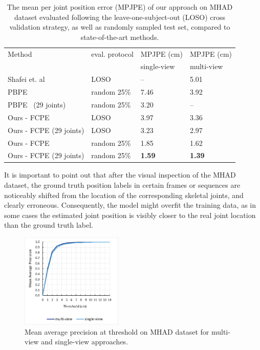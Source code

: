 \setlength{\tabcolsep}{4pt}
\begin{table}[H]
\begin{center}
\caption[Mean per joint position error on MHAD dataset, compared to state-of-the-art methods.]{The mean per joint position error (MPJPE) of our approach on MHAD dataset evaluated following the leave-one-subject-out (LOSO) cross validation strategy, as well as randomly sampled test set, compared to state-of-the-art methods.}
\label{table:mhad_results}
\begin{tabular}{llll}
\hline\noalign{\smallskip}
Method & eval. protocol &MPJPE (cm) & MPJPE (cm) \\
& & single-view & multi-view\\
\noalign{\smallskip}
\hline
\noalign{\smallskip}
Shafei et. al~\cite{Shafaei16}& LOSO & – & 5.01\\ 
PBPE~\cite{Ali19} &random 25\%& 7.46 & 3.92\\
PBPE~\cite{Ali19} (29 joints)&random 25\% & 3.20 & –\\
\hline\noalign{\smallskip}
Ours - FCPE &LOSO& 3.97 &3.36 \\ 
Ours - FCPE  (29 joints)&LOSO& 3.23& 2.97\\ 
Ours - FCPE &random 25\%&  1.85  & 1.62\\ 
Ours - FCPE  (29 joints)&random 25\%& {\bf 1.59}& {\bf 1.39}\\ 
\hline
\end{tabular}
\end{center}
\end{table}
\setlength{\tabcolsep}{1.4pt}

\noindent It is important to point out that after the visual inspection of the MHAD dataset, the ground truth position labels in certain frames or sequences are noticeably shifted from the location of the corresponding skeletal joints, and clearly erroneous. Consequently, the model might overfit the training data, as in some cases the estimated joint position is visibly closer to the real joint location than the ground truth label.\par
\vspace{5mm}

\begin{figure}[H]
\begin{center}
\centering
\includegraphics[height=170px]{images/results/MHAD_map.png}
\caption[Mean average precision at threshold on MHAD dataset.]{Mean average precision at threshold on MHAD dataset for multi-view and single-view approaches.}
\label{fig:MHAD_mAP}
\end{center}
\end{figure}



